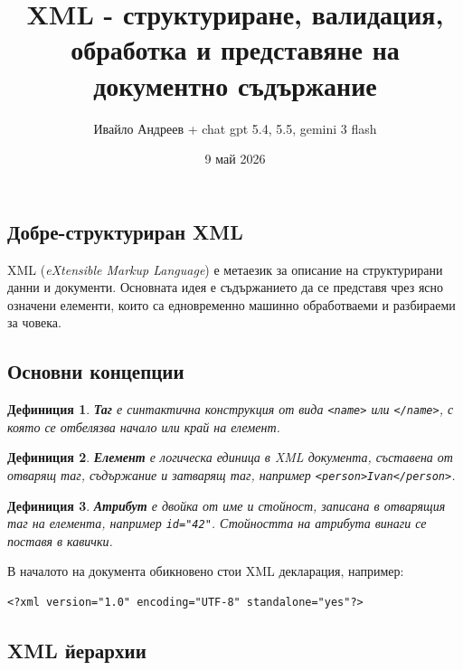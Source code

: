 \documentclass{scrartcl}
\title{XML - структуриране, валидация, обработка и представяне на документно съдържание}
\author{Ивайло Андреев + chat gpt 5.4, 5.5, gemini 3 flash}
\date{9 май 2026}
\newtheorem{definition}{Дефиниция}
\begin{document}
\maketitle

\tableofcontents
\newpage

\begin{FlushLeft}

\section{Добре-структуриран XML}

XML (\textit{eXtensible Markup Language}) е метаезик за описание на структурирани данни и документи. Основната идея е съдържанието да се представя чрез ясно означени елементи, които са едновременно машинно обработваеми и разбираеми за човека.

\subsection{Основни концепции}

\begin{definition}
\textbf{Таг} е синтактична конструкция от вида \texttt{<name>} или \texttt{</name>}, с която се отбелязва начало или край на елемент.
\end{definition}

\begin{definition}
\textbf{Елемент} е логическа единица в XML документа, съставена от отварящ таг, съдържание и затварящ таг, например \texttt{<person>Ivan</person>}.
\end{definition}

\begin{definition}
\textbf{Атрибут} е двойка от име и стойност, записана в отварящия таг на елемента, например \texttt{id="42"}. Стойността на атрибута винаги се поставя в кавички.
\end{definition}

В началото на документа обикновено стои XML декларация, например:

\begin{lstlisting}[caption=XML declaration example]
<?xml version="1.0" encoding="UTF-8" standalone="yes"?>
\end{lstlisting}

\subsection{XML йерархии}


\end{FlushLeft}
\end{document}
